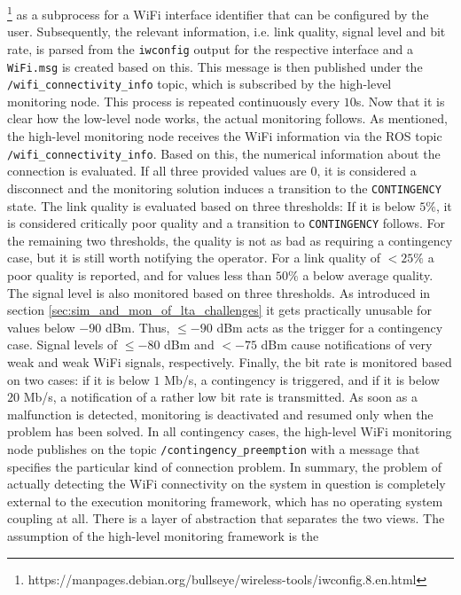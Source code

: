 \documentclass[english, master, utf8]{base/thesis_KBS}
\newcommand{\code}[1]{\colorbox{light-gray}{\texttt{#1}}}
\begin{document}
\footnote{https://manpages.debian.org/bullseye/wireless-tools/iwconfig.8.en.html} as a subprocess for a WiFi interface identifier that can be configured by the user. Subsequently,
the relevant information, i.e. link quality, signal level and bit rate, is parsed from the \code{iwconfig} output for the respective interface and a \code{WiFi.msg} is created
based on this. This message is then published under the \code{/wifi\_connectivity\_info} topic, which is subscribed by the high-level monitoring node. This process is repeated
continuously every $10$s.\newline
Now that it is clear how the low-level node works, the actual monitoring follows. As mentioned, the high-level monitoring node receives the WiFi information via the ROS topic
\code{/wifi\_connectivity\_info}. Based on this, the numerical information about the connection is evaluated. If all three provided values are $0$, it is considered
a disconnect and the monitoring solution induces a transition to the \code{CONTINGENCY} state. The link quality is evaluated based on three thresholds: If it is below $5\%$,
it is considered critically poor quality and a transition to \code{CONTINGENCY} follows. For the remaining two thresholds, the quality is not as bad as requiring a contingency
case, but it is still worth notifying the operator. For a link quality of $< 25\%$ a poor quality is reported, and for values less than $50\%$ a below average quality.
The signal level is also monitored based on three thresholds. As introduced in section \ref{sec:sim_and_mon_of_lta_challenges} it gets practically unusable for values below
$-90$ dBm. Thus, $\leq -90$ dBm acts as the trigger for a contingency case. Signal levels of $\leq -80$ dBm and $< -75$ dBm cause notifications of very weak and weak WiFi signals,
respectively. Finally, the bit rate is monitored based on two cases: if it is below $1$ Mb/s, a contingency is triggered, and if it is below $20$ Mb/s, a notification of a
rather low bit rate is transmitted. As soon as a malfunction is detected, monitoring is deactivated and resumed only when the problem has been solved. In all contingency
cases, the high-level WiFi monitoring node publishes on the topic \code{/contingency\_preemption} with a message that specifies the particular kind of connection problem.\newline
In summary, the problem of actually detecting the WiFi connectivity on the system in question is completely external to the execution monitoring framework,
which has no operating system coupling at all. There is a layer of abstraction that separates the two views. The assumption of the high-level monitoring framework is the
\end{document}

